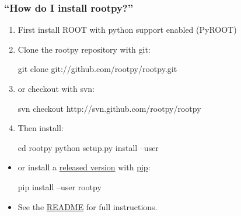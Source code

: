 \documentclass[10pt,professionalfonts,serif,usenames,dvipsnames,svgnames,table]{beamer}
\begin{document}
\begin{frame}[fragile]
    \frametitle{``How do I install rootpy?''}
    \begin{enumerate}
        \item First install ROOT with python support enabled (PyROOT)
        \item Clone the rootpy repository with git:
\begin{pyglist}[language=bash,texcl=true,style=vim]
git clone git://github.com/rootpy/rootpy.git
\end{pyglist}
        \item or checkout with svn:
\begin{pyglist}[language=bash,texcl=true,style=vim]
svn checkout http://svn.github.com/rootpy/rootpy
\end{pyglist}
        \item Then install:
\begin{pyglist}[language=bash,texcl=true,style=vim]
cd rootpy
python setup.py install --user
\end{pyglist}
\end{enumerate}
\begin{itemize}
    \item or install a \href{https://pypi.python.org/pypi/rootpy}{released version}
        with \href{https://pypi.python.org/pypi/pip}{pip}:
\begin{pyglist}[language=bash,texcl=true,style=vim]
pip install --user rootpy
\end{pyglist}
        \item See the
                \href{https://github.com/rootpy/rootpy/blob/master/README.rst}{README}
                for full instructions.
    \end{itemize}
\end{frame}
\end{document}
